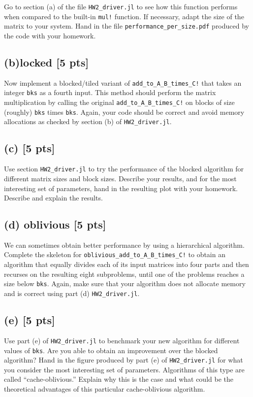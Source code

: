 \documentclass[twoside,10pt]{article}
\begin{document}
{Go to section (a) of the file \texttt{HW2\_driver.jl} to see how this function performs when compared to the built-in \texttt{mul!} function. 
If necessary, adapt the size of the matrix to your system. 
Hand in the file \texttt{performance\_per\_size.pdf} produced by the code with your homework. 

\subsection*{(b)locked [5 pts]} 
Now implement a blocked/tiled variant of \texttt{add\_to\_A\_B\_times\_C!} that takes an integer \texttt{bks} as a fourth input.
This method should perform the matrix multiplication by calling the original \texttt{add\_to\_A\_B\_times\_C!} on blocks of size (roughly) \texttt{bks} times \texttt{bks}.
Again, your code should be correct and avoid memory allocations as checked by section (b) of \texttt{HW2\_driver.jl}.

\subsection*{(c) [5 pts]}
Use section \texttt{HW2\_driver.jl} to try the performance of the blocked algorithm for different matrix sizes and block sizes. 
Describe your results, and for the most interesting set of parameters, hand in the resulting plot with your homework.
Describe and explain the results.

\subsection*{(d) oblivious [5 pts]}
We can sometimes obtain better performance by using a hierarchical algorithm. 
Complete the skeleton for \texttt{oblivious\_add\_to\_A\_B\_times\_C!} to obtain an algorithm that equally divides each of its input matrices into four parts and then recurses on the resulting eight subproblems, until one of the problems reaches a size below \texttt{bks}.
Again, make sure that your algorithm does not allocate memory and is correct using part (d) \texttt{HW2\_driver.jl}.

\subsection*{(e) [5 pts]} Use part (e) of \texttt{HW2\_driver.jl} to benchmark your new algorithm for different values of \texttt{bks}. 
Are you able to obtain an improvement over the blocked algorithm? 
Hand in the figure produced by part (e) of \texttt{HW2\_driver.jl} for what you consider the most interesting set of parameters.
Algorithms of this type are called ``cache-oblivious.'' 
Explain why this is the case and what could be the theoretical advantages of this particular cache-oblivious algorithm.

}
\end{document}
